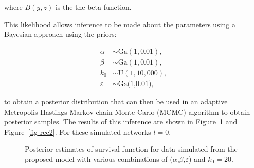 \documentclass[
  sn-basic,
]{sn-jnl}
\theoremstyle{plain}
\theoremstyle{remark}
\begin{document}
where \(B(y,z)\) is the the beta function.

This likelihood allows inference to be made about the parameters using a
Bayesian approach using the priors:

\begin{align*}
\alpha&\sim \text{Ga}(1,0.01),\\
\beta &\sim  \text{Ga}(1,0.01),\\
k_0 &\sim \text{U}(1,10,000),\\
\varepsilon &\sim \text{Ga(1,0.01)},
\end{align*}

to obtain a posterior distribution that can then be used in an adaptive
Metropolis-Hastings Markov chain Monte Carlo (MCMC) algorithm to obtain
posterior samples. The results of this inference are shown in
Figure~\ref{fig-rec1} and Figure~\ref{fig-rec2}. For these simulated
networks \(l=0\).

\begin{figure}[H]


\caption{\label{fig-rec1}Posterior estimates of survival function for
data simulated from the proposed model with various combinations of
(\(\alpha\),\(\beta\),\(\varepsilon\)) and \(k_0=20\).}

\end{figure}%
\end{document}
